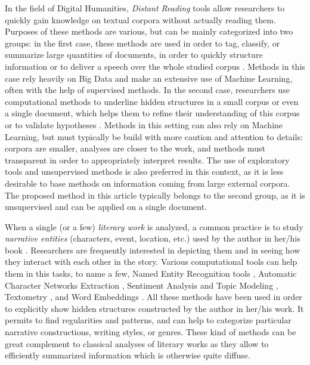 \documentclass[
twocolumn,
]{ceurart}
\begin{document}
In the field of Digital Humanities, \emph{Distant Reading} tools \cite{Moretti2014} allow researchers to quickly gain knowledge on textual corpora without actually reading them. Purposes of these methods are various, but can be mainly categorized into two groups: in the first case, these methods are used in order to tag, classify, or summarize large quantities of documents, in order to quickly structure information or to deliver a speech over the whole studied corpus \cite{Underwood2017}. Methods in this case rely heavily on Big Data and make an extensive use of Machine Learning, often with the help of supervised methods. In the second case, researchers use computational methods to underline hidden structures in a small corpus or even a single document, which helps them to refine their understanding of this corpus or to validate hypotheses \cite{Eve2017}. Methods in this setting can also rely on Machine Learning, but must typically be build with more caution and attention to details: corpora are smaller, analyses are closer to the work, and methods must transparent in order to appropriately interpret results. The use of exploratory tools and unsupervised methods is also preferred in this context, as it is less desirable to base methods on information coming from large external corpora. The proposed method in this article typically belongs to the second group, as it is unsupervised and can be applied on a single document.

When a single (or a few) \emph{literary work} is analyzed, a common practice is to study \emph{narrative entities} (characters, event, location, etc.) used by the author in her/his book \cite{Schmid2010}. Researchers are frequently interested in depicting them and in seeing how they interact with each other in the story. Various computational tools can help them in this tasks, to name a few, Named Entity Recognition tools \cite{Agarwal2013, Chaturvedi2017, Li2022}, Automatic Character Networks Extraction \cite{Labatut2019}, Sentiment Analysis and Topic Modeling \cite{Min2019}, Textometry \cite{Novakova2019}, and Word Embeddings \cite{Grayson2016, Heuser2017, Kerr2017}. All these methods have been used in order to explicitly show hidden structures constructed by the author in her/his work. It permits to find regularities and patterns, and can help to categorize particular narrative constructions, writing styles, or genres. These kind of methods can be great complement to classical analyses of literary works as they allow to efficiently summarized information which is otherwise quite diffuse.
\end{document}
